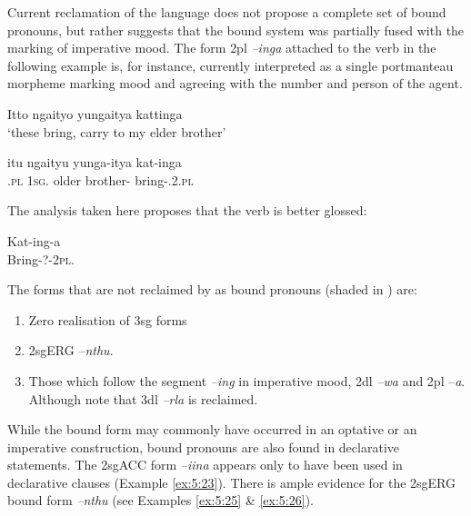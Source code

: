 Current reclamation of the language \citep[138]{amery_kulurdu_2013} does not propose a complete set of bound pronouns, but rather suggests that the bound system was partially fused with the marking of imperative mood. The form 2pl \textit{–inga} attached to the verb in the following example is, for instance, currently interpreted as a single portmanteau morpheme marking mood and agreeing with the number and person of the agent. 

\ea\label{ex:5:24}
Itto		 ngaityo 		yungaitya	     kattinga \\
\glt `these bring, carry to my elder brother'
       
\gll itu                 ngaityu      	 yunga-itya	    kat-inga \\
       .\textsc{pl}         1\textsc{sg}.  	{older brother-}   bring-.2.\textsc{pl}                            \\
\z

The analysis taken here proposes that the verb is better glossed:

\ea
\gll Kat-ing-a \\
              Bring-?-2\textsc{pl}.                    \\

\z


The forms that are not reclaimed by \citet{amery_kulurdu_2013} as bound pronouns (shaded in ) are:

\begin{enumerate}
	\item Zero realisation of 3sg forms
	\item 2sgERG –\textit{nthu}.\footnotemark
	\item Those which follow the segment \textit{–ing} in imperative mood, 2dl \textit{–wa} and 2pl –\textit{a}. Although note that 3dl \textit{–rla} is reclaimed.
\end{enumerate}

While the bound form may commonly have occurred in an optative or an imperative construction, bound pronouns are also found in declarative statements. The 2sgACC form \textit{–iina} appears only to have been used in declarative clauses (Example \ref{ex:5:23}). There is ample evidence for the 2sgERG bound form \textit{–nthu} (see Examples \ref{ex:5:25} \& \ref{ex:5:26}).

